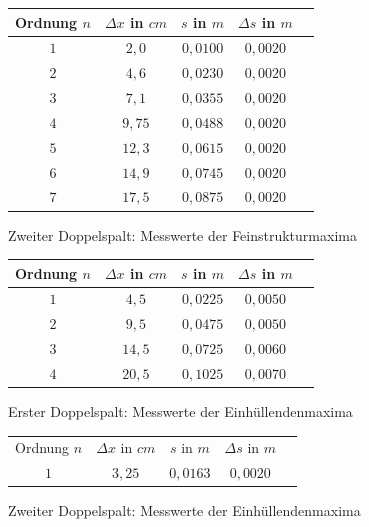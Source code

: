 \documentclass{article}
\begin{document}
\vspace{0,25cm}

\begin{center}
\begin{tabular}{|c|c|c|c|c|}
\hline
Ordnung \(n\) & \(\Delta x \) in \(cm\) & \(s\) in \(m\) & \(\Delta s\) in \(m\) \\
\hline
\( 1 \) & \( 2,0 \) & \( 0,0100 \) & \(0,0020\) \\
\( 2 \) & \( 4,6 \) & \( 0,0230 \) & \(0,0020\) \\
\( 3 \) & \( 7,1 \) & \( 0,0355 \) & \(0,0020\) \\
\( 4 \) & \( 9,75 \) & \( 0,0488 \) & \(0,0020\) \\
\( 5 \) & \( 12,3 \) & \( 0,0615 \) & \(0,0020\) \\
\( 6 \) & \( 14,9 \) & \( 0,0745 \) & \(0,0020\) \\
\( 7 \) & \( 17,5 \) & \( 0,0875 \) & \(0,0020\) \\
\hline
\end{tabular}

Zweiter Doppelspalt: Messwerte der Feinstrukturmaxima
\end{center}

\vspace{0,25cm}

\begin{center}
\begin{tabular}{|c|c|c|c|c|}
\hline
Ordnung \(n\) & \(\Delta x \) in \(cm\) & \(s\) in \(m\) & \(\Delta s\) in \(m\) \\
\hline
\( 1 \) & \( 4,5 \) & \( 0,0225 \) & \(0,0050\) \\
\( 2 \) & \( 9,5 \) & \( 0,0475 \) & \(0,0050\) \\
\( 3 \) & \( 14,5 \) & \( 0,0725 \) & \(0,0060\) \\
\( 4 \) & \( 20,5 \) & \( 0,1025 \) & \(0,0070\) \\
\hline
\end{tabular}

Erster Doppelspalt: Messwerte der Einhüllendenmaxima
\end{center}

\vspace{0,25cm}

\begin{center}
\begin{tabular}{|c|c|c|c|c|}

\hline
Ordnung \(n\) & \(\Delta x \) in \(cm\) & \(s\) in \(m\) & \(\Delta s\) in \(m\) \\
\( 1 \) & \( 3,25 \) & \( 0,0163 \) & \(0,0020\) \\
\hline
\end{tabular}

\vspace{0,25cm}

Zweiter Doppelspalt: Messwerte der Einhüllendenmaxima
\end{center}
\end{document}
